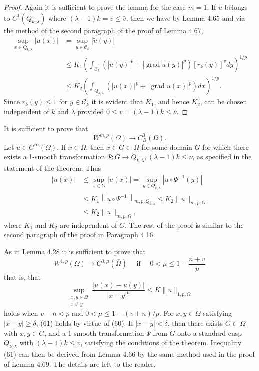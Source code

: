 \begin{proof}
  Again it is sufficient to prove the lemma for the case $m=1$. If $u$ belongs to $C^1\left(Q_{k, \lambda}\right)$ where $(\lambda-1) k=v \leq \bar{v}$, then we have by Lemma 4.65 and via the
  method of the second paragraph of the proof of Lemma 4.67,
  \[
  \begin{aligned}
  \sup _{x \in Q_{k, \lambda}}|u(x)| & =\sup _{y \in \mathcal{C}_k}|\tilde{u}(y)| \\
  & \leq K_1\left(\int_{\mathcal{C}_k}\left(|\tilde{u}(y)|^p+|\operatorname{grad} \tilde{u}(y)|^p\right)\left[r_k(y)\right]^v d y\right)^{1 / p} \\
  & \leq K_2\left(\int_{Q_{k, \lambda}}\left(|u(x)|^p+|\operatorname{grad} u(x)|^p\right) d x\right)^{1 / p} .
  \end{aligned}
  \]
  Since $r_k(y) \leq 1$ for $y \in \mathcal{C}_k$ it is evident that $K_1$, and hence $K_2$, can be chosen independent of $k$ and $\lambda$ provided $0 \leq v=(\lambda-1) k \leq \bar{\nu}$.
\end{proof}


\begin{para}
  It is sufficient to prove that
  \[
  W^{m, p}(\Omega) \rightarrow C_B^0(\Omega) .
  \]
  Let $u \in C^{\infty}(\Omega)$. If $x \in \Omega$, then $x \in G \subset \Omega$ for some domain $G$ for which there exists a 1-smooth transformation $\Psi: G \rightarrow Q_{k, \lambda},(\lambda-1) k \leq \nu$, as specified in the statement of the theorem. Thus
  \[
  \begin{aligned}
  |u(x)| & \leq \sup _{x \in G}|u(x)|=\sup _{y \in Q_{k, \lambda}}\left|u \circ \Psi^{-1}(y)\right| \\
  & \leq K_1\left\|u \circ \Psi^{-1}\right\|_{m, p, Q_{k, \lambda}} \leq K_2\|u\|_{m, p, G} \\
  & \leq K_2\|u\|_{m, p, \Omega},
  \end{aligned}
  \]
  where $K_1$ and $K_2$ are independent of $G$. The rest of the proof is similar to the second paragraph of the proof in Paragraph 4.16.
\end{para}

\begin{para}
  As in Lemma 4.28 it is sufficient to prove that
  \[
  W^{1, p}(\Omega) \rightarrow C^{0, \mu}(\bar{\Omega}) \quad \text { if } \quad 0<\mu \leq 1-\frac{n+v}{p}
  \]
  that is, that
  \[
  \sup _{\substack{x, y \in \Omega \\ x \neq y}} \frac{|u(x)-u(y)|}{|x-y|^\mu} \leq K\|u\|_{1, p, \Omega}
  \]
  holds when $v+n<p$ and $0<\mu \leq 1-(v+n) / p$. For $x, y \in \Omega$ satisfying $|x-y| \geq \delta$, (61) holds by virtue of (60). If $|x-y|<\delta$, then there exists $G \subset \Omega$ with $x, y \in G$, and a 1-smooth transformation $\Psi$ from $G$ onto a standard cusp $Q_{k, \lambda}$ with $(\lambda-1) k \leq v$, satisfying the conditions of the theorem. Inequality (61)
  can then be derived from Lemma 4.66 by the same method used in the proof of Lemma 4.69. The details are left to the reader.
\end{para}